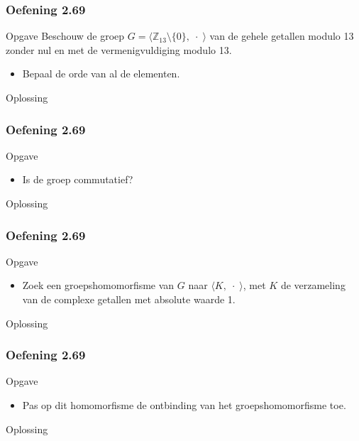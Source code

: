 \documentclass[10pt]{beamer}
\begin{document}
\begin{frame}
	\frametitle{Oefening 2.69}
	\begin{block}{Opgave}
		Beschouw de groep $G = \langle
		\mathbb{Z}_{13} \setminus \lbrace0\rbrace,\;\cdot\;\rangle$ 
		van de gehele getallen modulo 13 zonder nul 
		en met de vermenigvuldiging modulo 13.
		\begin{itemize}
			\item Bepaal de orde van al de elementen.
		\end{itemize}
	\end{block}
	\begin{block}{Oplossing}
		
	\end{block}
\end{frame}
\begin{frame}
	\frametitle{Oefening 2.69}
	\begin{block}{Opgave}
		\begin{itemize}
			\item Is de groep commutatief?
		\end{itemize}
	\end{block}
	\begin{block}{Oplossing}
		
	\end{block}
\end{frame}
\begin{frame}
	\frametitle{Oefening 2.69}
	\begin{block}{Opgave}
		\begin{itemize}
			\item Zoek een groepshomomorfisme van $G$ naar 
			$\langle K,\;\cdot\;\rangle$,
			met $K$ de verzameling van de complexe getallen 
			met absolute waarde 1.
		\end{itemize}
	\end{block}
	\begin{block}{Oplossing}
		
	\end{block}
\end{frame}
\begin{frame}
	\frametitle{Oefening 2.69}
	\begin{block}{Opgave}
		\begin{itemize}
			\item Pas op dit homomorfisme de ontbinding 
			van het groepshomomorfisme toe.
		\end{itemize}
	\end{block}
	\begin{block}{Oplossing}
		
	\end{block}
\end{frame}
\end{document}
